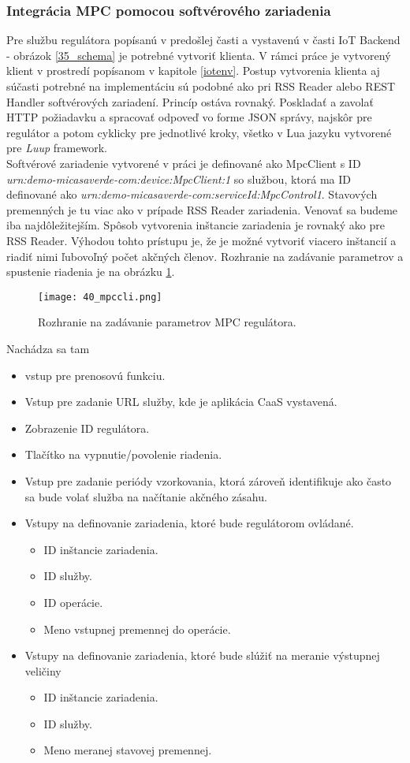 \subsubsection{Integrácia MPC pomocou softvérového zariadenia} \label{integ}
Pre službu regulátora popísanú v predošlej časti a vystavenú v časti IoT Backend - obrázok \ref{35_schema} je potrebné vytvoriť klienta. V rámci práce je vytvorený klient v prostredí popísanom v kapitole \ref{iotenv}. Postup vytvorenia klienta aj súčasti potrebné na implementáciu sú podobné ako pri RSS Reader alebo REST Handler softvérových zariadení. Princíp ostáva rovnaký. Poskladať a zavolať HTTP požiadavku a spracovať odpoveď vo forme JSON správy, najskôr pre regulátor a potom cyklicky pre jednotlivé kroky, všetko v Lua jazyku vytvorené pre \textit{Luup} framework.\\
\indent Softvérové zariadenie vytvorené v práci je definované ako MpcClient s ID \textit{urn:demo-micasaverde-com:device:MpcClient:1} so službou, ktorá ma ID definované ako \textit{urn:demo-micasaverde-com:serviceId:MpcControl1}. Stavových premenných je tu viac ako v prípade RSS Reader zariadenia. Venovať sa budeme iba najdôležitejším. Spôsob vytvorenia inštancie zariadenia je rovnaký ako pre RSS Reader. Výhodou tohto prístupu je, že je možné vytvoriť viacero inštancií a riadiť nimi ľubovoľný počet akčných členov. Rozhranie na zadávanie parametrov a spustenie riadenia je na obrázku  \ref{40_mpccli}.
\begin{figure}[!htbp]
\centering
\texttt{[image: 40\_mpccli.png]}
\caption{Rozhranie na zadávanie parametrov MPC regulátora.}
\label{40_mpccli}
\end{figure} 
Nachádza sa tam
\begin{itemize}
  \item vstup pre prenosovú funkciu.
  \item Vstup pre zadanie URL služby, kde je aplikácia CaaS vystavená.
  \item Zobrazenie ID regulátora.
  \item Tlačítko na vypnutie/povolenie riadenia.
  \item Vstup pre zadanie periódy vzorkovania, ktorá zároveň identifikuje ako často sa bude volať služba na načítanie akčného zásahu.
  \item Vstupy na definovanie zariadenia, ktoré bude regulátorom ovládané.  
  \begin{itemize}
    \item ID inštancie zariadenia.
    \item ID služby.    
    \item ID operácie.    
    \item Meno vstupnej premennej do operácie.
  \end{itemize} 
  \item Vstupy na definovanie zariadenia, ktoré bude slúžiť na meranie výstupnej veličiny
  \begin{itemize}
    \item ID inštancie zariadenia.
    \item ID služby.    
    \item Meno meranej stavovej premennej.    
  \end{itemize}     
\end{itemize}

